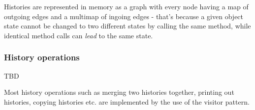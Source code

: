 \documentclass{article}
\begin{document}
Histories are represented in memory as a graph with every node having a map of outgoing edges and a multimap of ingoing edges - that's because a given object state cannot be changed to two different states by calling the same method, while identical method calls can \emph{lead} to the same state.

\subsubsection{History operations}

TBD

Most history operations such as merging two histories together, printing out histories, copying histories etc. are implemented by the use of the visitor pattern.
\end{document}
